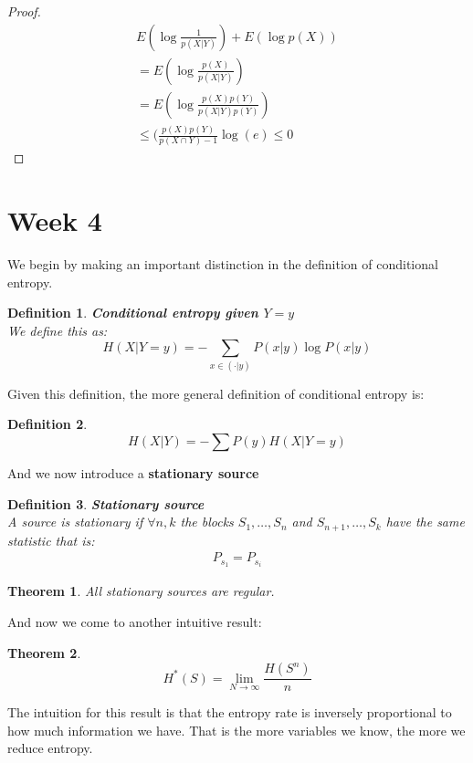 \documentclass[titlepage]{article}
\newtheorem{theorem}{Theorem}[section]
\newtheorem{definition}{Definition}
\begin{document}
\begin{proof}
\begin{align*}
    E(\log\frac{1}{p(X|Y)}) + E(\log p(X))\\
    = E(\log\frac{p(X)}{p(X|Y)})\\
    = E(\log\frac{p(X)p(Y)}{p(X|Y)p(Y)})\\
    \leq (\frac{p(X)p(Y)}{p(X\cap Y) - 1}\log(e)
    \leq 0
\end{align*}
\end{proof}

\section{Week 4}

We begin by making an important distinction in the definition of conditional entropy.

\begin{definition}\textbf{Conditional entropy given $Y=y$}
\\
We define this as:
$$H(X|Y=y) = - \sum_{x \in (\cdot | y)} P(x|y)\log P(x|y)$$
\end{definition}

Given this definition, the more general definition of conditional entropy is:

\begin{definition}
$$H(X|Y) = - \sum P(y)H(X|Y=y) $$
\end{definition}

And we now introduce a \textbf{stationary source}

\begin{definition}\textbf{Stationary source}
\\
A source is stationary if $\forall n,k$ the blocks $S_{1}, \ldots, S_{n}$ and $S_{n+1}, \ldots, S_{k}$ have the same statistic that is:
\begin{align*}
    P_{s_{1}} = P_{s_{i}}
\end{align*}

\end{definition}


\begin{theorem}
All stationary sources are regular. 
\end{theorem}

And now we come to another intuitive result:
\begin{theorem}
$$H^{*}(S) = \lim_{N\to \infty}\frac{H(S^{n})}{n}$$
\end{theorem}

The intuition for this result is that the entropy rate is inversely proportional to how much information we have. That is the more variables we know, the more we reduce entropy. 
\end{document}
